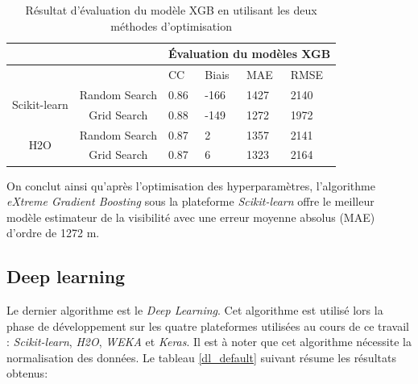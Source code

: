 \begin{table}[!ht]
    \centering
    \begin{tabular}{ |c|c|p{1.5cm}|p{1.5cm}|p{2cm}|p{2cm}|  }
     \hline
     \multicolumn{2}{|c|}{} &\multicolumn{4}{|c|}{Évaluation du modèles XGB} \\
     \hline
     \multicolumn{2}{|c|}{} & CC & Biais & MAE & RMSE\\
     \hline
    \multirow{2}{*}{Scikit-learn} &
     Random Search & 0.86 & -166 & 1427 &  2140\\
     & Grid Search & 0.88 & -149 & 1272 &  1972\\
     \hline
     \multirow{2}{*}{H2O} &
     Random Search & 0.87 & 2 & 1357 & 2141\\
     & Grid Search & 0.87 & 6 & 1323 & 2164\\
     \hline
    \end{tabular}
    \caption{Résultat d'évaluation du modèle XGB en utilisant les deux méthodes d'optimisation}
    \label{xgb_ev_Tuning}
\end{table}

  On conclut ainsi qu'après l'optimisation des hyperparamètres,  l'algorithme \textit{eXtreme Gradient Boosting} sous la plateforme \textit{Scikit-learn} offre le meilleur modèle estimateur de la visibilité avec une erreur moyenne absolus (MAE) d'ordre de 1272 m.

\subsection*{Deep learning}
Le dernier algorithme est le \textit{Deep Learning}. Cet algorithme est utilisé lors la phase de développement sur les quatre plateformes utilisées au cours de ce travail : \textit{Scikit-learn}, \textit{H2O}, \textit{WEKA} et \textit{Keras}. Il est à noter que cet algorithme nécessite  la normalisation des données. Le tableau \ref{dl_default} suivant résume les résultats obtenus:\\

